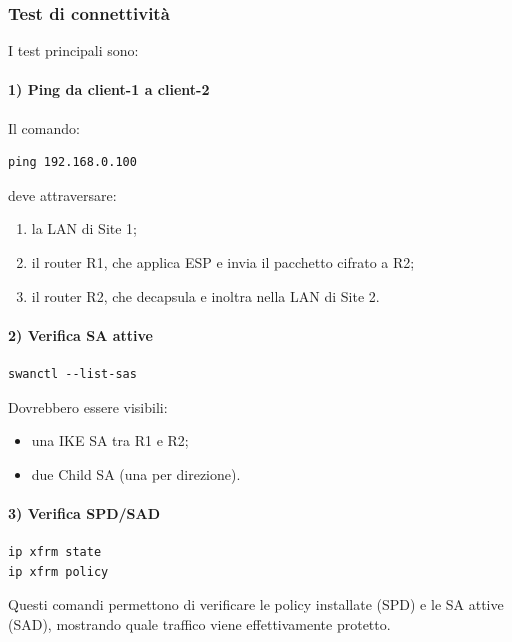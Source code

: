 \subsubsection{Test di connettività}

I test principali sono:

\paragraph{1) Ping da client-1 a client-2}

Il comando:

\begin{verbatim}
ping 192.168.0.100
\end{verbatim}

deve attraversare:

\begin{enumerate}
    \item la LAN di Site 1;
    \item il router R1, che applica ESP e invia il pacchetto cifrato a R2;
    \item il router R2, che decapsula e inoltra nella LAN di Site 2.
\end{enumerate}

\paragraph{2) Verifica SA attive}

\begin{verbatim}
swanctl --list-sas
\end{verbatim}

Dovrebbero essere visibili:

\begin{itemize}
    \item una IKE SA tra R1 e R2;
    \item due Child SA (una per direzione).
\end{itemize}

\paragraph{3) Verifica SPD/SAD}

\begin{verbatim}
ip xfrm state
ip xfrm policy
\end{verbatim}

Questi comandi permettono di verificare le policy installate (SPD) e le SA attive (SAD),
mostrando quale traffico viene effettivamente protetto.

